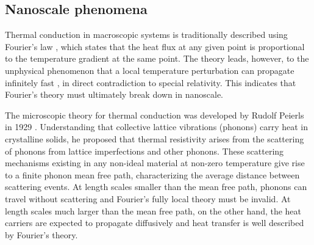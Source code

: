 \subsection{Nanoscale phenomena}



Thermal conduction in macroscopic systems is traditionally described using Fourier's law \cite{}, which states that the heat flux at any given point is proportional to the temperature gradient at the same point. The theory leads, however, to the unphysical phenomenon that a local temperature perturbation can propagate infinitely fast \cite{chen}, in direct contradiction to special relativity. This indicates that Fourier's theory must ultimately break down in nanoscale.

The microscopic theory for thermal conduction was developed by Rudolf Peierls in 1929 \cite{}. Understanding that collective lattice vibrations (phonons) carry heat in crystalline solids, he proposed that thermal resistivity arises from the scattering of phonons from lattice imperfections and other phonons. These scattering mechanisms existing in any non-ideal material at non-zero temperature give rise to a finite phonon mean free path, characterizing the average distance between scattering events. At length scales smaller than the mean free path, phonons can travel without scattering and Fourier's fully local theory must be invalid. At length scales much larger than the mean free path, on the other hand, the heat carriers are expected to propagate diffusively and heat transfer is well described by Fourier's theory.

